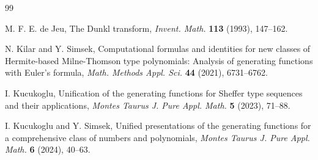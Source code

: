 \documentclass[11pt]{article}
\theoremstyle{plain}
\theoremstyle{remark}
\numberwithin{equation}{section} %
\begin{document}
\begin{thebibliography}{99}

M. F. E. de Jeu,
{The Dunkl transform},
\textit{Invent. Math.}
\textbf{113} (1993), 147--162.



N. Kilar and Y. Simsek,
Computational formulas and identities for new classes of Hermite-based Milne-Thomson type polynomials: Analysis of generating functions with Euler's formula,
\textit{Math. Methods Appl. Sci.}
\textbf{44} (2021), 6731--6762. %




I. Kucukoglu,
Unification of the generating functions for Sheffer type sequences and their applications, 
\textit{Montes Taurus J. Pure Appl. Math.}
\textbf{5} (2023), 71--88. %


I. Kucukoglu and Y. Simsek,
Unified presentations of the generating functions for a comprehensive class of numbers and polynomials,
\textit{Montes Taurus J. Pure Appl. Math.}
\textbf{6} (2024), 40--63. %





\end{thebibliography}
\end{document}
